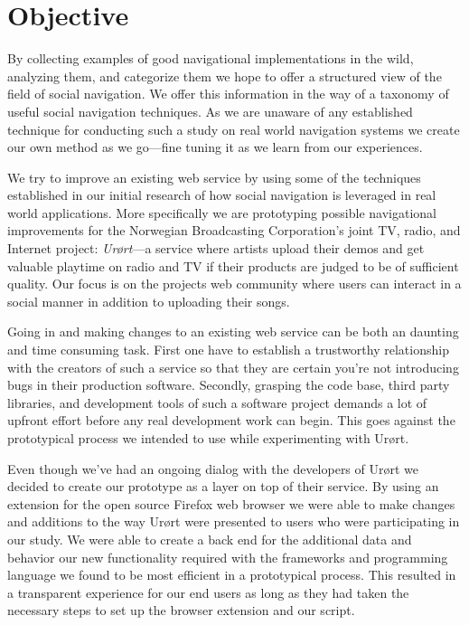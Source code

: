 \section{Objective}

By collecting examples of good navigational implementations in the wild,
analyzing them, and categorize them we hope to offer a structured view of the
field of social navigation. We offer this information in the way of a taxonomy
of useful social navigation techniques.
As we are unaware of any established technique for
conducting such a study on real world navigation systems we create our own
method as we go---fine tuning it as we learn from our experiences.

We try to improve an existing web service by using some of the techniques
established in our initial research of how social navigation is leveraged
in real world applications. More specifically we are prototyping possible
navigational improvements for the Norwegian Broadcasting Corporation's joint
TV, radio, and Internet project: \emph{Ur\o{}rt}---a service where artists upload
their demos and get valuable playtime on radio and TV if their products are
judged to be of sufficient quality. Our focus is on the projects
web community where users can
interact in a social manner in addition to uploading their songs.

Going in and making changes to an existing web service can be both an
daunting and time consuming task. First one have to establish a trustworthy
relationship with the creators of such a service so that they are certain
you're not introducing bugs in their production software. Secondly, grasping the
code base, third party libraries, and development tools of such a software
project demands a lot of upfront effort before any real development work can
begin. This goes against the prototypical process we intended to use while
experimenting with Ur\o{}rt.

Even though we've had an ongoing dialog with the developers of Ur\o{}rt we
decided to create our prototype as a layer on top of their service. By using an
extension%
\sidefill%
 for the open source Firefox%
web browser we were able to make changes and additions to the way Ur\o{}rt were
presented to users who were participating in our study. We were able to create
a back end for the additional data and behavior our new functionality required
with the frameworks and programming language we found to be most efficient in
a prototypical process. This resulted in a transparent experience for our end
users as long as they had taken the necessary steps to set up the browser
extension and our script.

